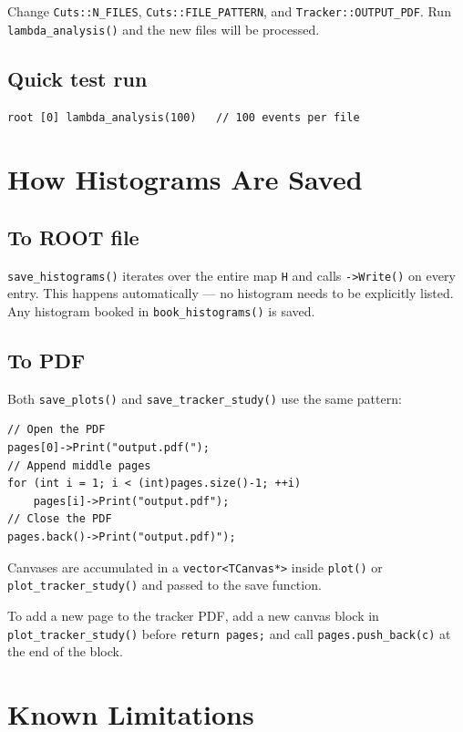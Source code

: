 \documentclass[11pt]{article}
\begin{document}
Change \texttt{Cuts::N\_FILES}, \texttt{Cuts::FILE\_PATTERN}, and
\texttt{Tracker::OUTPUT\_PDF}. Run \texttt{lambda\_analysis()} and
the new files will be processed.

\subsection{Quick test run}
\begin{lstlisting}
root [0] lambda_analysis(100)   // 100 events per file
\end{lstlisting}

\section{How Histograms Are Saved}

\subsection{To ROOT file}

\texttt{save\_histograms()} iterates over the entire map \texttt{H}
and calls \texttt{->Write()} on every entry. This happens automatically
--- no histogram needs to be explicitly listed. Any histogram booked in
\texttt{book\_histograms()} is saved.

\subsection{To PDF}

Both \texttt{save\_plots()} and \texttt{save\_tracker\_study()} use the
same pattern:
\begin{lstlisting}
// Open the PDF
pages[0]->Print("output.pdf(");
// Append middle pages
for (int i = 1; i < (int)pages.size()-1; ++i)
    pages[i]->Print("output.pdf");
// Close the PDF
pages.back()->Print("output.pdf)");
\end{lstlisting}
Canvases are accumulated in a \texttt{vector<TCanvas*>} inside
\texttt{plot()} or \texttt{plot\_tracker\_study()} and passed to the
save function.

To add a new page to the tracker PDF, add a new canvas block in
\texttt{plot\_tracker\_study()} before \texttt{return pages;} and call
\texttt{pages.push\_back(c)} at the end of the block.

\section{Known Limitations}
\end{document}
